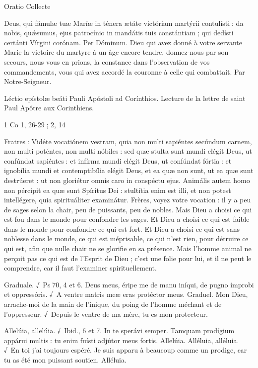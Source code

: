 \begin{paracol}{2}
Oratio
\switchcolumn
Collecte
\switchcolumn*

Deus, qui fámulæ tuæ Maríæ in  ténera ætáte victóriam martýrii contulísti : da nobis, quǽsumus, ejus patrocínio in mandátis tuis constántiam ; qui dedísti certánti Vírgini corónam. Per Dóminum.
\switchcolumn
Dieu qui avez donné à votre servante  Marie la victoire du martyre à un âge encore tendre, donnez-nous par son secours, nous vous en prions, la constance dans l’observation de vos commandements, vous qui avez accordé la couronne à celle qui combattait. Par Notre-Seigneur.
\switchcolumn*

Léctio epístolæ beáti Pauli Apóstoli ad Corínthios.
\switchcolumn
Lecture de la lettre de saint Paul Apôtre aux Corinthiens.
\switchcolumn*

1 Co 1, 26-29 ; 2, 14
\switchcolumn

\switchcolumn*

Fratres : Vidéte vocatiónem vestram,  quia non multi sapiéntes secúndum carnem, non multi poténtes, non multi nóbiles : sed quæ stulta sunt mundi elégit Deus, ut confúndat sapiéntes : et infírma mundi elégit Deus, ut confúndat fórtia : et ignobília mundi et contemptibília elégit Deus, et ea quæ non sunt, ut ea quæ sunt destrúeret : ut non gloriétur omnis caro in conspéctu ejus. Animális autem homo non pércipit ea quæ sunt Spíritus Dei : stultítia enim est illi, et non potest intellégere, quia spirituáliter examinátur.
\switchcolumn
Frères, voyez votre vocation : il y a peu  de sages selon la chair, peu de puissants, peu de nobles. Mais Dieu a choisi ce qui est fou dans le monde pour confondre les sages. Et Dieu a choisi ce qui est faible dans le monde pour confondre ce qui est fort. Et Dieu a choisi ce qui est sans noblesse dans le monde, ce qui est méprisable, ce qui n’est rien, pour détruire ce qui est, afin que nulle chair ne se glorifie en sa présence. Mais l’homme animal ne perçoit pas ce qui est de l’Esprit de Dieu ; c’est une folie pour lui, et il ne peut le comprendre, car il faut l’examiner spirituellement.
\switchcolumn*

Graduale. √~Ps 70, 4 et 6. Deus meus, éripe me de manu iníqui, de pugno ímprobi et oppressóris. √~A ventre matris meæ eras protéctor meus.
\switchcolumn
Graduel. Mon Dieu, arrache-moi de la main de l’inique, du poing de l’homme méchant et de l’oppresseur. √~Depuis le ventre de ma mère, tu es mon protecteur.
\switchcolumn*

Allelúia, allelúia. √~Ibid., 6 et 7. In te sperávi semper. Tamquam prodígium appárui multis : tu enim fuísti adjútor meus fortis. Allelúia.
\switchcolumn
Alléluia, alléluia. √~En toi j’ai toujours espéré. Je suis apparu à beaucoup comme un prodige, car tu as été mon puissant soutien. Alléluia.
\switchcolumn*


\end{paracol}
